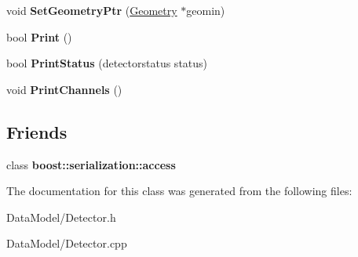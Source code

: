 \begin{DoxyCompactItemize}
\item 
\hypertarget{classDetector_a314120e55ef11500f7e0463e94ae37bb}{
void {\bfseries SetGeometryPtr} (\hyperlink{classGeometry}{Geometry} $\ast$geomin)}
\label{classDetector_a314120e55ef11500f7e0463e94ae37bb}

\item 
\hypertarget{classDetector_a89a77c0af830a448ab599e9cfce4a2d8}{
bool {\bfseries Print} ()}
\label{classDetector_a89a77c0af830a448ab599e9cfce4a2d8}

\item 
\hypertarget{classDetector_a4fced6fd118fe1371ee7e7193c666710}{
bool {\bfseries PrintStatus} (detectorstatus status)}
\label{classDetector_a4fced6fd118fe1371ee7e7193c666710}

\item 
\hypertarget{classDetector_af25e30e52b653b1380743676322f88ea}{
void {\bfseries PrintChannels} ()}
\label{classDetector_af25e30e52b653b1380743676322f88ea}

\end{DoxyCompactItemize}
\subsection*{Friends}
\begin{DoxyCompactItemize}
\item 
\hypertarget{classDetector_ac98d07dd8f7b70e16ccb9a01abf56b9c}{
class {\bfseries boost::serialization::access}}
\label{classDetector_ac98d07dd8f7b70e16ccb9a01abf56b9c}

\end{DoxyCompactItemize}


The documentation for this class was generated from the following files:\begin{DoxyCompactItemize}
\item 
DataModel/Detector.h\item 
DataModel/Detector.cpp\end{DoxyCompactItemize}
